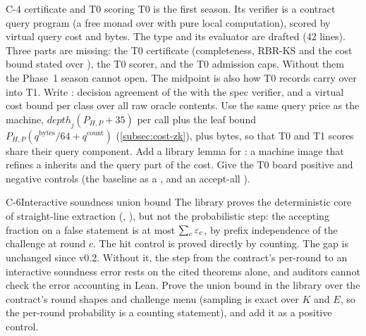 \begin{issue}{C-4}{ certificate and T0 scoring}
\IRprob T0 is the first season. Its verifier is a contract query program  (a free monad
over  with pure local computation), scored by virtual query cost and bytes. The type and
its evaluator are drafted (42 lines). Three parts are missing: the T0 certificate (completeness,
RBR-KS and the cost bound stated over ), the T0 scorer, and the T0 admission caps.
\IRwhy Without them the Phase~1 season cannot open. The  midpoint is also how T0
records carry over into T1.
\IRres Write : decision agreement of the  with the spec verifier,
and a virtual cost bound per class over all raw oracle contents. Use the same query price as the
machine, $\mathit{depth}_j(P_{H,P}+35)$ per call plus the leaf bound
$P_{H,P}(q^{\mathrm{bytes}}/64+q^{\mathrm{count}})$ (\cref{subsec:cost-zk}), plus bytes, so that T0
and T1 scores share their query component. Add a library lemma for : a machine image that
refines a  inherits  and the query part of the cost. Give the T0 board
positive and negative controls (the baseline as a , and an accept-all ).
\end{issue}

\begin{issue}{C-6}{Interactive soundness union bound}
\IRprob The library proves the deterministic core of straight-line extraction
(, ), but not the probabilistic step: the accepting
fraction on a false statement is at most $\sum_c\varepsilon_c$, by prefix independence of the challenge at
round $c$. The hit control is proved directly by counting. The gap is unchanged since v0.2.
\IRwhy Without it, the step from the contract's per-round  to an interactive soundness
error rests on the cited theorems alone, and auditors cannot check the error accounting in Lean.
\IRres Prove the union bound in the library over the contract's round shapes and challenge menu
(sampling is exact over $K$ and $E$, so the per-round probability is a counting statement), and add
it as a positive control.
\end{issue}

